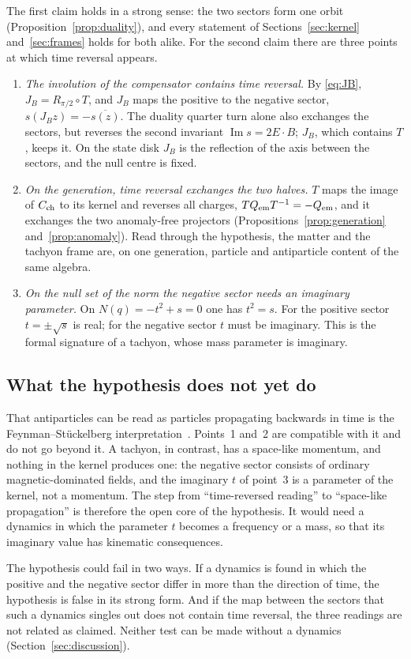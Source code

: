 The first claim holds in a strong sense: the two sectors form one orbit (Proposition~\ref{prop:duality}), and every statement of
Sections~\ref{sec:kernel} and~\ref{sec:frames} holds for both alike.  For the second claim there are three points at which time reversal appears.
\begin{enumerate}
\item \emph{The involution of the compensator contains time reversal.}  By \eqref{eq:JB}, \(J_B=R_{\pi/2}\circ T\), and \(J_B\) maps the positive to the
negative sector, \(s(J_Bz)=-\overline{s(z)}\).  The duality quarter turn alone also exchanges the sectors, but reverses the second invariant
\(\operatorname{Im}s=2E\cdot B\); \(J_B\), which contains \(T\), keeps it.  On the state disk \(J_B\) is the reflection of the axis between the sectors,
and the null centre is fixed.
\item \emph{On the generation, time reversal exchanges the two halves.}  \(T\) maps the image of \(C_{\rm ch}\) to its kernel and reverses all charges,
\(TQ_{\rm em}T^{-1}=-Q_{\rm em}\), and it exchanges the two anomaly-free projectors (Propositions~\ref{prop:generation} and~\ref{prop:anomaly}).  Read through
the hypothesis, the matter and the tachyon frame are, on one generation, particle and antiparticle content of the same algebra.
\item \emph{On the null set of the norm the negative sector needs an imaginary parameter.}  On \(N(q)=-t^2+s=0\) one has \(t^2=s\).  For the positive
sector \(t=\pm\sqrt s\) is real; for the negative sector \(t\) must be imaginary.  This is the formal signature of a tachyon, whose mass
parameter is imaginary.
\end{enumerate}

\subsection{What the hypothesis does not yet do}

That antiparticles can be read as particles propagating backwards in time is the Feynman--St\"uckelberg interpretation~\cite{stueckelberg,feynman}.
Points~1 and~2 are compatible with it and do not go beyond it.  A tachyon, in contrast, has a space-like momentum, and nothing in the kernel
produces one: the negative sector consists of ordinary magnetic-dominated fields, and the imaginary \(t\) of point~3 is a parameter of the
kernel, not a momentum.  The step from ``time-reversed reading'' to ``space-like propagation'' is therefore the open core of the hypothesis.
It would need a dynamics in which the parameter \(t\) becomes a frequency or a mass, so that its imaginary value has kinematic consequences.

The hypothesis could fail in two ways.  If a dynamics is found in which the positive and the negative sector differ in more than the
direction of time, the hypothesis is false in its strong form.  And if the map between the sectors that such a dynamics singles out does not
contain time reversal, the three readings are not related as claimed.  Neither test can be made without a dynamics
(Section~\ref{sec:discussion}).
